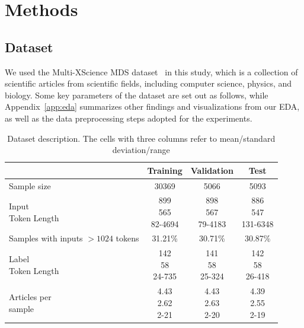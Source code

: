 \documentclass[12pt, twocolumn]{article}
\numberwithin{equation}{section}
\begin{document}
\section{Methods}
\label{sec:methods}

\subsection{Dataset}
\label{ssec:dataset}

We used the Multi-XScience MDS dataset~\cite{lu-etal-2020-multi-xscience} in this study, which is a collection of scientific articles from scientific fields, including computer science, physics, and biology.  Some key parameters of the dataset are set out as follows, while Appendix~\ref{app:eda} summarizes other findings and visualizations from our EDA, as well as the data preprocessing steps adopted for the experiments.  

\begin{table}
    \small
    \begin{tabular}{|l|c|c|c|}
    \hline
        ~ & Training & Validation & Test  
        \\ \hline
        Sample size & 30369 & 5066 & 5093 
	\\ \hline
        \shortstack{Input\\Token Length}
	    & \shortstack{899 \\ 565 \\ 82-4694}
	    & \shortstack{898 \\ 567 \\ 79-4183}
	    & \shortstack{886 \\ 547 \\ 131-6348}
	\\ \hline
        \shortstack{Samples with\\inputs $>1024$\\tokens} & 31.21\% & 30.71\% & 30.87\% 
        \\ \hline
        \shortstack{Label\\Token Length}
	    & \shortstack{142 \\ 58 \\ 24-735}
	    & \shortstack{141 \\ 58 \\ 25-324}
	    & \shortstack{142 \\ 58 \\ 26-418}
	\\ \hline
        \shortstack{Articles per\\sample}
	    & \shortstack{4.43 \\ 2.62 \\ 2-21}
	    & \shortstack{4.43 \\ 2.63 \\ 2-20}
	    & \shortstack{4.39 \\ 2.55 \\ 2-19}
	 \\ \hline
    \end{tabular}
    \caption{Dataset description. The cells with three columns refer to mean/standard deviation/range}
\end{table}
\end{document}
